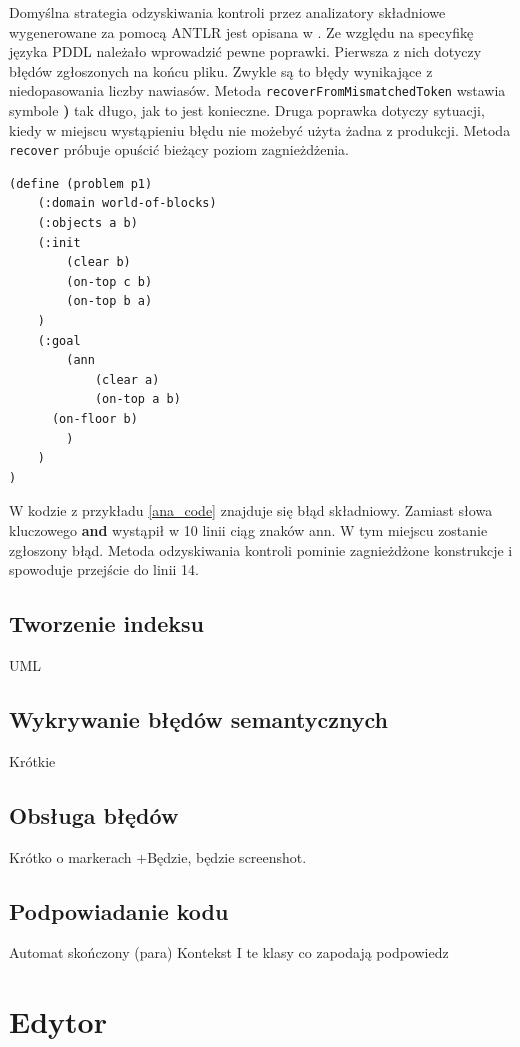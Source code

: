 Domyślna strategia odzyskiwania kontroli przez analizatory składniowe wygenerowane 
za pomocą ANTLR jest opisana w \cite{antlr}. Ze względu na specyfikę języka PDDL
należało wprowadzić pewne poprawki. Pierwsza z nich dotyczy błędów zgłoszonych na końcu pliku.
Zwykle są to błędy wynikające z niedopasowania liczby nawiasów.
Metoda \texttt{recoverFromMismatchedToken} wstawia symbole \textbf{)} tak długo, jak to jest konieczne.
Druga poprawka dotyczy sytuacji, kiedy w miejscu wystąpieniu błędu nie możebyć użyta żadna
z produkcji. Metoda \texttt{recover} próbuje opuścić bieżący poziom zagnieżdżenia.

\begin{lstlisting}[label=ana_code, caption=Kod PDDL zawierający błąd składniowy]
(define (problem p1)
	(:domain world-of-blocks)
	(:objects a b)
	(:init
		(clear b)
		(on-top c b)
		(on-top b a)
	)
	(:goal
		(ann
			(clear a)
			(on-top a b)
      (on-floor b)
		)
	)
)
\end{lstlisting}

W kodzie z przykładu \ref{ana_code} znajduje się błąd składniowy. Zamiast słowa kluczowego \textbf{and}
wystąpił w 10 linii ciąg znaków ann. W tym miejscu zostanie zgłoszony błąd. Metoda odzyskiwania kontroli
pominie zagnieżdżone konstrukcje i spowoduje przejście do linii 14.

\subsection{Tworzenie indeksu}
UML

\subsection{Wykrywanie błędów semantycznych}
Krótkie

\subsection{Obsługa błędów}
Krótko o markerach
+Będzie, będzie screenshot.


\subsection{Podpowiadanie kodu}
Automat skończony (para)
Kontekst
I te klasy co zapodają podpowiedz

\section{Edytor}
